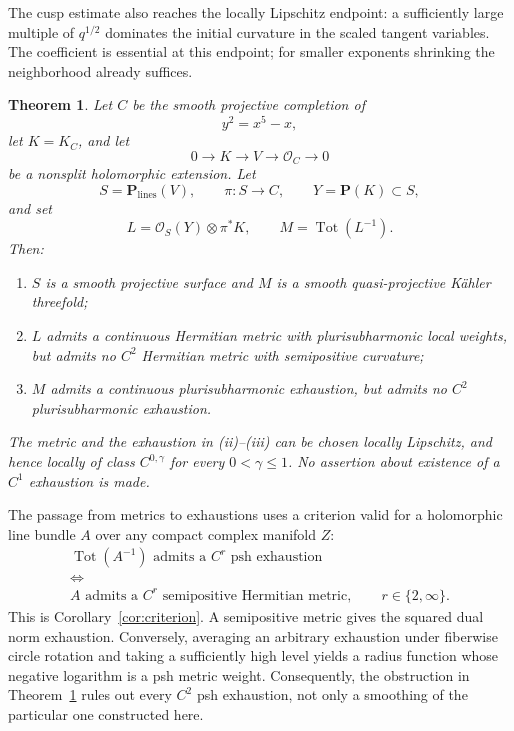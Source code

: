\documentclass[11pt]{amsart}
\newtheorem{theorem}{Theorem}[section]
\theoremstyle{definition}
\theoremstyle{remark}
\numberwithin{equation}{section}
\newcommand{\PP}{\mathbf P}
\newcommand{\OO}{\mathcal O}
\newcommand{\Tot}{\operatorname{Tot}}
\begin{document}
The cusp estimate also reaches the locally Lipschitz endpoint: a
sufficiently large multiple of $q^{1/2}$ dominates the initial
curvature in the scaled tangent variables. The coefficient is
essential at this endpoint; for smaller exponents shrinking the
neighborhood already suffices.

\begin{theorem}\label{thm:main}
Let $C$ be the smooth projective completion of
\[
 y^2=x^5-x,
\]
let $K=K_C$, and let
\begin{equation}\label{eq:extension-intro}
 0\longrightarrow K\longrightarrow V\longrightarrow\OO_C
 \longrightarrow0
\end{equation}
be a nonsplit holomorphic extension. Let
\[
 S=\PP_{\mathrm{lines}}(V),\qquad
 \pi:S\longrightarrow C,\qquad
 Y=\PP(K)\subset S,
\]
and set
\begin{equation}\label{eq:main-line}
 L=\OO_S(Y)\otimes\pi^*K,\qquad M=\Tot(L^{-1}).
\end{equation}
Then:
\begin{enumerate}[label=\textup{(\roman*)},leftmargin=2.5em]
 \item $S$ is a smooth projective surface and $M$ is a smooth
 quasi-projective K\"ahler threefold;
 \item $L$ admits a continuous Hermitian metric with plurisubharmonic
 local weights, but admits no $C^2$ Hermitian metric with semipositive
 curvature;
 \item $M$ admits a continuous plurisubharmonic exhaustion, but admits
 no $C^2$ plurisubharmonic exhaustion.
\end{enumerate}
The metric and the exhaustion in \textup{(ii)--(iii)} can be chosen
locally Lipschitz, and hence locally of class $C^{0,\gamma}$ for every
$0<\gamma\le1$. No assertion about existence of a $C^1$ exhaustion
is made.
\end{theorem}

The passage from metrics to exhaustions uses a criterion valid for a
holomorphic line bundle $A$ over any compact complex manifold $Z$:
\[
\begin{gathered}
 \Tot(A^{-1})\text{ admits a }C^r\text{ psh exhaustion}\\
 \Longleftrightarrow\\[-2pt]
 A\text{ admits a }C^r\text{ semipositive Hermitian metric},
 \qquad r\in\{2,\infty\}.
\end{gathered}
\]
This is Corollary~\ref{cor:criterion}. A semipositive metric gives the
squared dual norm exhaustion. Conversely, averaging an arbitrary
exhaustion under fiberwise circle rotation and taking a sufficiently
high level yields a radius function whose negative logarithm is a psh
metric weight. Consequently, the obstruction in Theorem~\ref{thm:main}
rules out every $C^2$ psh exhaustion, not only a smoothing of the
particular one constructed here.
\end{document}
